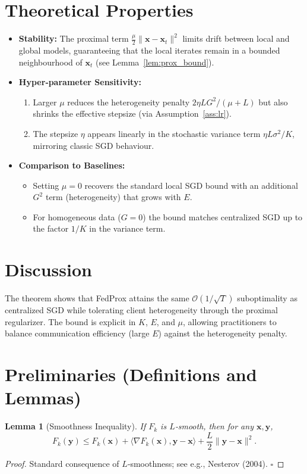 \documentclass{article}
\newtheorem{lemma}{Lemma}
\begin{document}
\section*{Theoretical Properties}
\begin{itemize}
    \item \textbf{Stability:} The proximal term $\frac{\mu}{2}\|\mathbf{x}-\mathbf{x}_t\|^2$ limits drift between local and global models, guaranteeing that the local iterates remain in a bounded neighbourhood of $\mathbf{x}_t$ (see Lemma~\ref{lem:prox_bound}).
    \item \textbf{Hyper‑parameter Sensitivity:}
    \begin{enumerate}
        \item Larger $\mu$ reduces the heterogeneity penalty $2\eta L G^2/(\mu+L)$ but also shrinks the effective stepsize (via Assumption~\ref{ass:lr}).
        \item The stepsize $\eta$ appears linearly in the stochastic variance term $\eta L\sigma^2/K$, mirroring classic SGD behaviour.
    \end{enumerate}
    \item \textbf{Comparison to Baselines:}
    \begin{itemize}
        \item Setting $\mu=0$ recovers the standard local SGD bound with an additional $G^2$ term (heterogeneity) that grows with $E$.
        \item For homogeneous data ($G=0$) the bound matches centralized SGD up to the factor $1/K$ in the variance term.
    \end{itemize}
\end{itemize}

\section*{Discussion}
The theorem shows that FedProx attains the same $\mathcal{O}(1/\sqrt{T})$ suboptimality as centralized SGD while tolerating client heterogeneity through the proximal regularizer. The bound is explicit in $K$, $E$, and $\mu$, allowing practitioners to balance communication efficiency (large $E$) against the heterogeneity penalty.

\newpage

\section*{Preliminaries (Definitions and Lemmas)}
\begin{lemma}[Smoothness Inequality]\label{lem:smooth}
If $F_k$ is $L$‑smooth, then for any $\mathbf{x},\mathbf{y}$,
\[
    F_k(\mathbf{y})\le F_k(\mathbf{x})+\langle\nabla F_k(\mathbf{x}),\mathbf{y}-\mathbf{x}\rangle
    +\frac{L}{2}\|\mathbf{y}-\mathbf{x}\|^2.
\tag{4}
\]
\end{lemma}
\begin{proof}
Standard consequence of $L$‑smoothness; see e.g., Nesterov (2004). \hfill $\square$
\end{proof}
\end{document}
